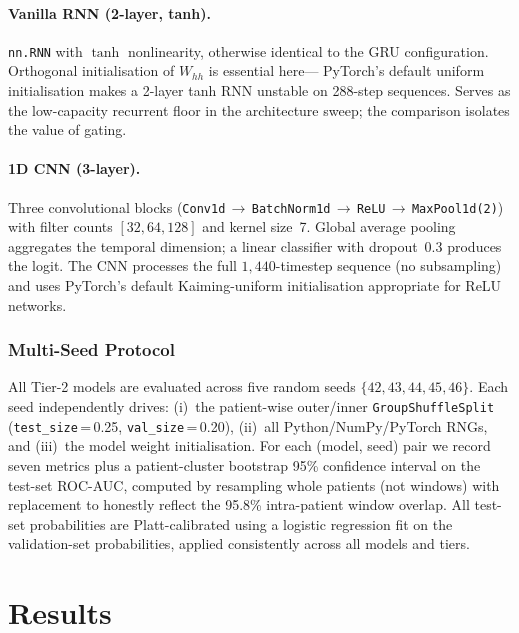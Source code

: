 \documentclass[11pt,a4paper]{article}
\begin{document}
\paragraph{Vanilla RNN (2-layer, tanh).}
\texttt{nn.RNN} with $\tanh$ nonlinearity, otherwise identical to the GRU
configuration.  Orthogonal initialisation of $W_{hh}$ is essential here---
PyTorch's default uniform initialisation makes a 2-layer tanh RNN
unstable on 288-step sequences.  Serves as the low-capacity recurrent floor
in the architecture sweep; the comparison isolates the value of gating.

\paragraph{1D CNN (3-layer).}
Three convolutional blocks
(\texttt{Conv1d}\,$\to$\,\texttt{BatchNorm1d}\,$\to$\,\texttt{ReLU}\,$\to$\,\texttt{MaxPool1d(2)})
with filter counts $[32, 64, 128]$ and kernel size~7.  Global average
pooling aggregates the temporal dimension; a linear classifier with
dropout~0.3 produces the logit.  The CNN processes the full
$1{,}440$-timestep sequence (no subsampling) and uses PyTorch's default
Kaiming-uniform initialisation appropriate for ReLU networks.

\subsubsection{Multi-Seed Protocol}\label{sec:multi-seed}

All Tier-2 models are evaluated across five random seeds
$\{42, 43, 44, 45, 46\}$.  Each seed independently drives:
(i)~the patient-wise outer/inner \texttt{GroupShuffleSplit}
(\texttt{test\_size}\,=\,0.25, \texttt{val\_size}\,=\,0.20),
(ii)~all Python/NumPy/PyTorch RNGs, and
(iii)~the model weight initialisation.  For each (model, seed) pair we
record seven metrics plus a patient-cluster bootstrap 95\% confidence
interval on the test-set ROC-AUC, computed by resampling whole patients
(not windows) with replacement to honestly reflect the 95.8\% intra-patient
window overlap.  All test-set probabilities are Platt-calibrated using a
logistic regression fit on the validation-set probabilities, applied
consistently across all models and tiers.

\section{Results}\label{sec:results}
\end{document}
